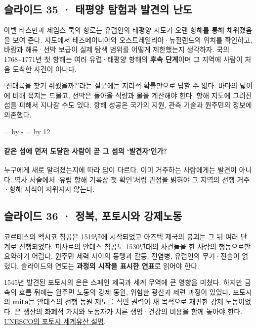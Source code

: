\documentclass[10pt,a4paper]{article}
\newcommand{\ReserveQuestionSpace}{%
  \par\begingroup
  \dimen0=\pagegoal \advance\dimen0 by -\pagetotal
  \dimen2=\baselineskip \multiply\dimen2 by 12
  \ifdim\dimen0<\dimen2 \newpage\fi
  \endgroup}
\begin{document}
\subsection{슬라이드 35 · 태평양 탐험과 발견의 난도}
아벨 타스만과 제임스 쿡의 항로는 유럽인의 태평양 지도가 오랜 항해를 통해 채워졌음을 보여 준다. 지도에서 태즈메이니아와 오스트레일리아·뉴질랜드의 위치를 확인하고, 바람과 해류·선박 보급이 실제 탐색 범위를 어떻게 제한했는지 생각하자. 쿡의 1768\textasciitilde{}1771년 첫 항해는 여러 유럽·태평양 항해의 \textbf{후속 단계}이며 그 지역에 사람이 처음 도착한 사건이 아니다.\par

‘신대륙을 찾기 쉬웠을까?’라는 질문에는 지리적 확률만으로 답할 수 없다. 바다의 넓이에 비해 육지는 드물고, 선박은 돌아올 식량과 물을 계산해야 한다. 항해 지도에 그려진 섬을 피해서 지나갈 수도 있다. 항해 성공은 국가의 지원, 관측 기술과 원주민의 정보에 의존했다.\par

\ReserveQuestionSpace
\paragraph{같은 섬에 먼저 도달한 사람이 곧 그 섬의 ‘발견자’인가?}
누구에게 새로 알려졌는지에 따라 답이 다르다. 이미 거주하는 사람에게는 발견이 아니다. 역사 서술에서 ‘유럽 항해 기록상 첫 확인’처럼 관점을 밝혀야 그 지역의 선행 거주·항해 지식이 지워지지 않는다.\par

\subsection{슬라이드 36 · 정복, 포토시와 강제노동}
코르테스의 멕시코 침공은 1519년에 시작되었고 아즈텍 제국의 붕괴는 그 뒤 여러 단계로 진행되었다. 피사로의 안데스 침공도 1530년대의 사건들을 한 사람의 행동으로만 요약하기 어렵다. 원주민 세력 사이의 동맹과 갈등, 전염병, 유럽인의 무기·전술이 얽혔다. 슬라이드의 연도는 \textbf{과정의 시작을 표시한 연표}로 읽어야 한다.\par

1545년 발견된 포토시의 은은 스페인 제국과 세계 무역에 큰 영향을 미쳤다. 하지만 금속의 흐름 뒤에는 원주민 노동의 강제 동원, 위험한 광산과 제련 과정이 있었다. 포토시의 \textbf{mita}는 안데스의 선행 동원 제도를 식민 권력이 새 목적으로 재편한 강제 노동이었다. 은 생산의 화폐적 가치와 노동자가 치른 생명·건강의 비용을 함께 놓아야 한다. \href{https://whc.unesco.org/en/list/420}{UNESCO의 포토시 세계유산 설명}.\par
\end{document}
